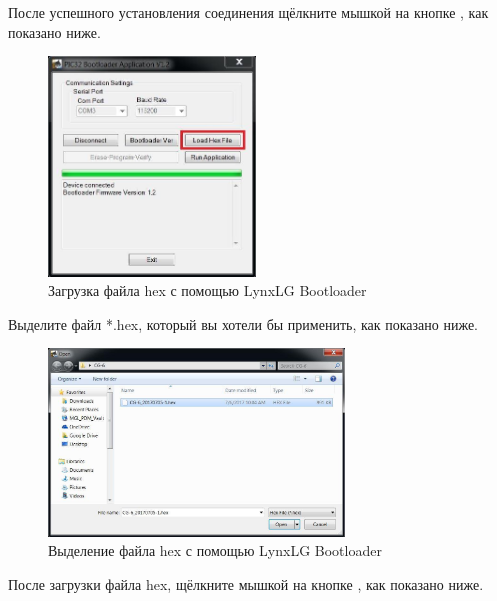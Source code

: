 После успешного установления соединения щёлкните мышкой на кнопке , как показано ниже.

\begin{figure}[H]
  \centering
  \includegraphics[width=0.49\textwidth]{figures/loading_the_hex_file_with_lynxlg_bootloader}
  \caption{Загрузка файла hex с помощью LynxLG Bootloader}
  \label{fig:loading_the_hex_file_with_lynxlg_bootloader}
\end{figure}

Выделите файл *.hex, который вы хотели бы применить, как показано ниже.

\begin{figure}[H]
  \centering
  \includegraphics[width=0.7\textwidth]{figures/selecting_the_hex_file_with_the_lynxlg_bootloader}
  \caption{Выделение файла hex с помощью LynxLG Bootloader}
  \label{fig:selecting_the_hex_file_with_the_lynxlg_bootloader}
\end{figure}

После загрузки файла hex, щёлкните мышкой на кнопке ,
как показано ниже.

